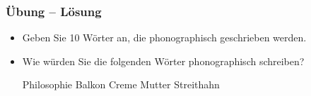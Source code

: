 
\begin{frame}
\frametitle{Übung -- Lösung}

\begin{itemize}
	\item Geben Sie 10 Wörter an, die phonographisch geschrieben werden.
	
		\begin{description}
			\item[] 
		\end{description}
	
	\item Wie würden Sie die folgenden Wörter phonographisch schreiben?
		
	\begin{exe}
	\settowidth{}
		\begin{xlist}
			\ex Philosophie 
			\ex Balkon 
			\ex Creme 
			\ex Mutter 
			\ex Streithahn 
		\end{xlist}
	\end{exe}
		

\end{itemize}

\end{frame}

